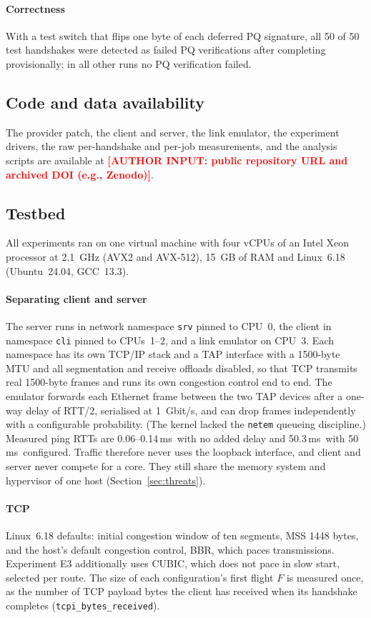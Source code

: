 \documentclass[preprint,10pt,3p]{elsarticle}
\newcommand{\ms}{\,ms}
\newcommand{\authorinput}[1]{\textcolor{red}{\textbf{[AUTHOR INPUT: #1]}}}
\begin{document}
\paragraph{Correctness} With a test switch that flips one byte of each
deferred PQ signature, all 50 of 50 test handshakes were detected as failed
PQ verifications after completing provisionally; in all other runs no PQ
verification failed.

\subsection{Code and data availability}
\label{sec:availability}

The provider patch, the client and server, the link emulator, the
experiment drivers, the raw per-handshake and per-job measurements, and the
analysis scripts are available at \authorinput{public repository URL and
archived DOI (e.g., Zenodo)}.

\subsection{Testbed}

All experiments ran on one virtual machine with four vCPUs of an Intel
Xeon processor at 2.1~GHz (AVX2 and AVX-512), 15~GB of RAM and Linux~6.18
(Ubuntu~24.04, GCC~13.3).

\paragraph{Separating client and server} The server runs in network
namespace \texttt{srv} pinned to CPU~0, the client in namespace \texttt{cli}
pinned to CPUs~1--2, and a link emulator on CPU~3.  Each namespace has its
own TCP/IP stack and a TAP interface with a 1500-byte MTU and all
segmentation and receive offloads disabled, so that TCP transmits real
1500-byte frames and runs its own congestion control end to end.  The
emulator forwards each Ethernet frame between the two TAP devices after a
one-way delay of RTT/2, serialised at 1~Gbit/s, and can drop frames
independently with a configurable probability.  (The kernel lacked the
\texttt{netem} queueing discipline.)  Measured ping RTTs are 0.06--0.14\ms\
with no added delay and 50.3\ms\ with 50\ms\ configured.  Traffic therefore
never uses the loopback interface, and client and server never compete for
a core.  They still share the memory system and hypervisor of one host
(Section~\ref{sec:threats}).

\paragraph{TCP} Linux~6.18 defaults: initial congestion window of ten
segments, MSS 1448 bytes, and the host's default congestion control, BBR,
which paces transmissions.  Experiment E3 additionally uses CUBIC, which
does not pace in slow start, selected per route.  The size of each
configuration's first flight $F$ is measured once, as the number of TCP
payload bytes the client has received when its handshake completes
(\texttt{tcpi\_bytes\_received}).
\end{document}
